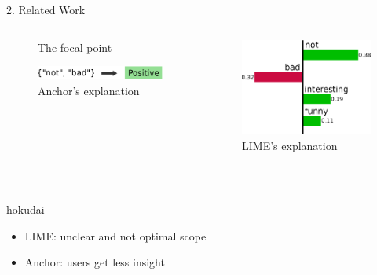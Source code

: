 \documentclass[unicode]{beamer}
\begin{document}
\begin{frame}
\begin{columns}[t]
\begin{column}{\lcol\linewidth}
\begin{block}{2. Related Work}
\begin{columns}[]
\begin{column}{0.4\textwidth}
\begin{figure}
              \caption{The focal point}
            \end{figure}
            \vspace{0.5em}
            \begin{figure}
              \includegraphics[width=\textwidth]{src/img/example-anchor}
              \caption{Anchor's explanation}
            \end{figure}
          \end{column}
          \begin{column}{0.35\textwidth}
            \begin{figure}
              \includegraphics[width=\textwidth]{src/img/example-lime}
              \caption{LIME's explanation}
            \end{figure}
          \end{column}
        \end{columns}
        \vspace{0.3em}
        {
          \begin{center}~%
            \begin{beamercolorbox}[wd=0.7\textwidth,colsep=0.3cm,rounded=true,shadow=true]{hokudai}
              \vspace{-0.2em}
              \begin{itemize}
                \item LIME\@: unclear and not optimal scope
                \item Anchor: users get less insight

\end{itemize}
\end{beamercolorbox}
\end{center}}
\end{block}
\end{column}
\end{columns}
\end{frame}
\end{document}

